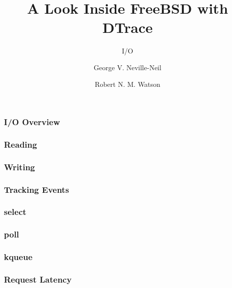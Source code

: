\documentclass[pdftex]{beamer}
\begin{document}

\title{A Look Inside FreeBSD with DTrace}
\subtitle{I/O}
\author[shortname]{George V. Neville-Neil \and Robert N. M. Watson}

\begin{frame}
  \frametitle{I/O Overview}
  
\end{frame}

\begin{frame}
  \frametitle{Reading}
  
\end{frame}

\begin{frame}
  \frametitle{Writing}
  
\end{frame}

\begin{frame}
  \frametitle{Tracking Events}
  
\end{frame}

\begin{frame}
  \frametitle{select}
  
\end{frame}

\begin{frame}
  \frametitle{poll}
  
\end{frame}

\begin{frame}
  \frametitle{kqueue}
  
\end{frame}

\begin{frame}
  \frametitle{Request Latency}
  
\end{frame}
\end{document}
